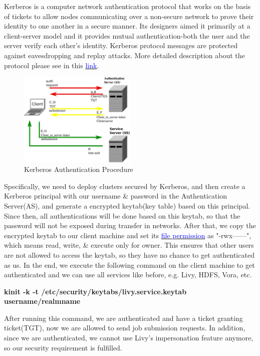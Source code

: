 \documentclass[article,colorback,accentcolor=tud4c]{tudreport}
\begin{document}
	Kerberos is a computer network authentication protocol that works on the basis of tickets to allow nodes communicating over a non-secure network to prove their identity to one another in a secure manner. Its designers aimed it primarily at a client-server model and it provides mutual authentication-both the user and the server verify each other's identity. Kerberos protocol messages are protected against eavesdropping and replay attacks.\cite{kerberos} More detailed description about the protocol please see in this \href{https://en.wikipedia.org/wiki/Kerberos_(protocol)#Description}{\textcolor{blue}{link}}.
	
	\begin{figure}[!h]
		\centering
		\includegraphics[width=0.5\textwidth]{Kerberos}
		\caption{Kerberos Authentication Procedure\cite{kerberos}}
	\end{figure}
	
	Specifically, we need to deploy clusters secured by Kerberos, and then create a Kerberos principal with our username \& password in the Authentication Server(AS), and generate a encrypted keytab(key table) based on this principal. Since then, all authentications will be done based on this keytab, so that the password will not be exposed during transfer in networks. After that, we copy the encrypted keytab to our client machine and set its \href{https://en.wikipedia.org/wiki/File_system_permissions#Numeric_notation}{\textcolor{blue}{file permission}} as "-rwx------", which means read, write, \& execute only for owner. This ensures that other users are not allowed to access the keytab, so they have no chance to get authenticated as us. In the end, we execute the following command on the client machine to get authenticated and we can use all services like before, e.g. Livy, HDFS, Vora, etc.
	
	\noindent\textbf{kinit -k -t /etc/security/keytabs/livy.service.keytab username/realmname}
	
	After running this command, we are authenticated and have a ticket granting ticket(TGT), now we are allowed to send job submission requests. In addition, since we are authenticated, we cannot use Livy's impersonation feature anymore, so our security requirement is fulfilled.
	
\end{document}
